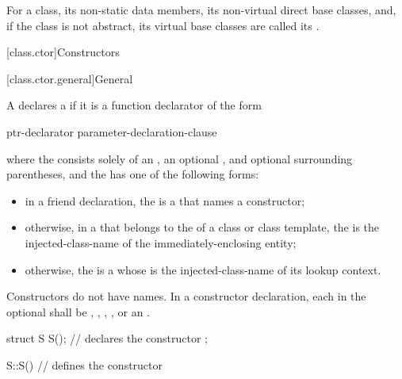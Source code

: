 \pnum
For a class, its non-static data members, its non-virtual direct base classes,
and, if the class is not abstract, its virtual base
classes are called its .

[class.ctor]{Constructors}%

[class.ctor.general]{General}%
%
%

\pnum
A  declares a  if it is a
function declarator of the form
\begin{ncbnf}
ptr-declarator \terminal{(} parameter-declaration-clause \terminal{)}  
\end{ncbnf}
where the  consists solely of an
, an optional ,
and optional surrounding parentheses, and the  has
one of the following forms:
\begin{itemize}
\item
in a friend declaration,
the  is a 
that names a constructor;
\item
otherwise, in a  that belongs to the
 of a class or class template,
the  is the
injected-class-name of the immediately-enclosing entity;

\item
otherwise, the
 is a 
whose  is
the injected-class-name of its lookup context.
\end{itemize}
Constructors do not have names.
In a constructor declaration, each  in the optional
 shall be
,
,
,
, or
an .
\begin{example}
\begin{codeblock}
struct S {
  S();              // declares the constructor
};

S::S() { }          // defines the constructor
\end{codeblock}
\end{example}

